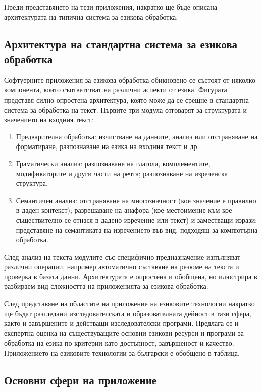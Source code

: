 \begin{multicols}{2}
Преди представянето на тези приложения, накратко ще бъде описана  архитектурата на типична система за езикова обработка.


\subsection{Архитектура на стандартна система за езикова обработка}


Софтуерните приложения за езикова обработка обикновено се състоят от няколко компонента, които съответстват на различни аспекти от езика. Фигурата представя силно опростена архитектура, която може да се срещне в стандартна система за обработка на текст. 
Първите три модула отговарят за структурата и значението на входния текст:
\begin{enumerate}
\item Предварителна обработка: изчистване на данните, анализ или отстраняване на форматиране, разпознаване на езика на входния текст и др. 
\item Граматически анализ: разпознаване на глагола, комплементите, модификаторите и други части на речта; разпознаване на изреченска структура. 
\item Семантичен анализ: отстраняване на многозначност (кое значение е правилно в даден контекст); разрешаване на анафора (кое местоимение към кое съществително се отнася в дадено изречение или текст) и заместващи изрази; представяне на семантиката на изречението във вид, подходящ за компютърна обработка. 
\end{enumerate}

След анализ на текста модулите със специфично предназначение изпълняват различни операции, например автоматично съставяне на резюме на текста и проверка в базата данни. Архитектурата е опростена и обобщена, но илюстрира в разбираем вид сложността на приложенията за езикова обработка. 

След представяне на областите на приложение на езиковите технологии накратко ще бъдат разгледани изследователската и образователната дейност в тази сфера, както и завършените и действащи изследователски програми. Предлага се  и експертна оценка на съществуващите основни езикови ресурси и програми за обработка на езика по критерии като достъпност, завършеност и качество. Приложението на езиковите технологии за български е обобщено в таблица.



\subsection{Основни сфери на приложение}



\end{multicols}
